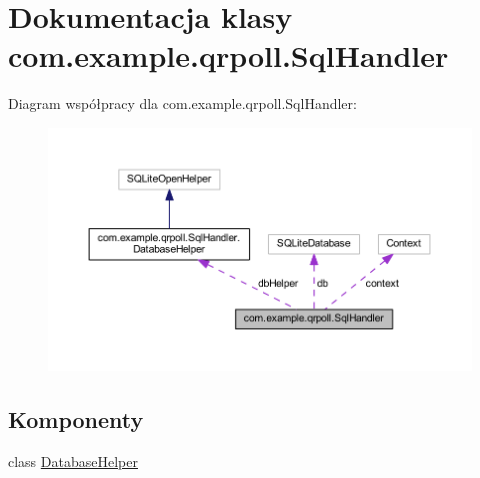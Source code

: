 \hypertarget{classcom_1_1example_1_1qrpoll_1_1_sql_handler}{\section{Dokumentacja klasy com.\+example.\+qrpoll.\+Sql\+Handler}
\label{classcom_1_1example_1_1qrpoll_1_1_sql_handler}
}


Diagram współpracy dla com.\+example.\+qrpoll.\+Sql\+Handler\+:
\nopagebreak
\begin{figure}[H]
\begin{center}
\leavevmode
\includegraphics[width=350pt]{classcom_1_1example_1_1qrpoll_1_1_sql_handler__coll__graph}
\end{center}
\end{figure}
\subsection*{Komponenty}
\begin{DoxyCompactItemize}
\item 
class \hyperlink{classcom_1_1example_1_1qrpoll_1_1_sql_handler_1_1_database_helper}{Database\+Helper}
\end{DoxyCompactItemize}
